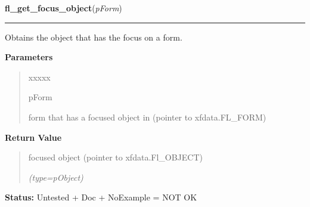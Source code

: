 \hspace{.8\funcindent}\begin{boxedminipage}{\funcwidth}

    \raggedright \textbf{fl\_get\_focus\_object}(\textit{pForm})

    \vspace{-1.5ex}

    \rule{\textwidth}{0.5\fboxrule}
\setlength{\parskip}{2ex}
    Obtains the object that has the focus on a form.

\setlength{\parskip}{1ex}
      \textbf{Parameters}
      \vspace{-1ex}

      \begin{quote}
        \begin{Ventry}{xxxxx}

          \item[pForm]

          form that has a focused object in (pointer to xfdata.FL\_FORM)

        \end{Ventry}

      \end{quote}

      \textbf{Return Value}
    \vspace{-1ex}

      \begin{quote}
      focused object (pointer to xfdata.Fl\_OBJECT)

      {\it (type=pObject)}

      \end{quote}

\textbf{Status:} Untested + Doc + NoExample = NOT OK



    \end{boxedminipage}

    \label{xformslib:library:fl_reset_focus_object}

    \vspace{0.5ex}


